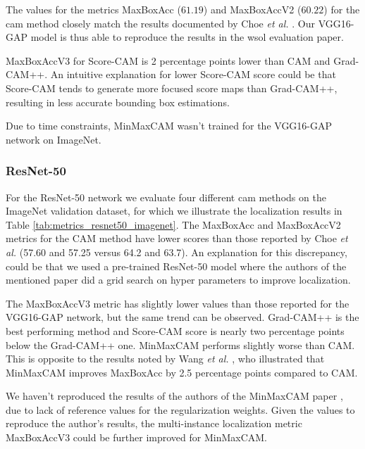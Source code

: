 The values for the metrics MaxBoxAcc ($61.19$) and MaxBoxAccV2 ($60.22$) for the \acrshort{cam} method closely match the results documented by Choe \textit{et al.} \cite{choe2020evaluating}. Our VGG16-GAP model is thus able to reproduce the results in the \acrshort{wsol} evaluation paper.

MaxBoxAccV3 for Score-CAM is 2 percentage points lower than CAM and Grad-CAM++. An intuitive explanation for lower Score-CAM score could be that Score-CAM tends to generate more focused score maps than Grad-CAM++, resulting in less accurate bounding box estimations. 

Due to time constraints, MinMaxCAM wasn't trained for the VGG16-GAP network on ImageNet.

\subsubsection{ResNet-50}

For the ResNet-50 network we evaluate four different \acrshort{cam} methods on the ImageNet validation dataset, for which we illustrate the localization results in Table \ref{tab:metrics_resnet50_imagenet}. The MaxBoxAcc and MaxBoxAccV2 metrics for the CAM method have lower scores than those reported by Choe \textit{et al.} (57.60 and 57.25 versus 64.2 and 63.7). An explanation for this discrepancy, could be that we used a pre-trained ResNet-50 model where the authors of the mentioned paper did a grid search on hyper parameters to improve localization. 

The MaxBoxAccV3 metric has slightly lower values than those reported for the VGG16-GAP network, but the same trend can be observed. Grad-CAM++ is the best performing method and Score-CAM score is nearly two percentage points below the Grad-CAM++ one. MinMaxCAM performs slightly worse than CAM. This is opposite to the results noted by Wang \textit{et al.} \cite{wang2021minmaxcam}, who illustrated that MinMaxCAM improves MaxBoxAcc by 2.5 percentage points compared to CAM. 

We haven't reproduced the results of the authors of the MinMaxCAM paper \cite{wang2021minmaxcam}, due to lack of reference values for the regularization weights. Given the values to reproduce the author's results, the multi-instance localization metric MaxBoxAccV3 could be further improved for MinMaxCAM.

